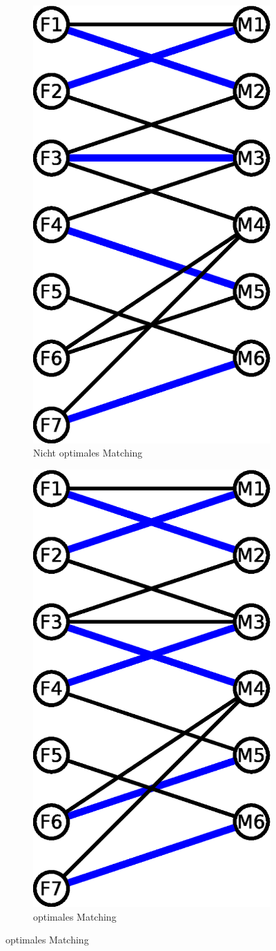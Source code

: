 \begin{figure}[H]
	\centering
	\begin{subfigure}[H]{0.4\linewidth}
		\centering
		\includegraphics[width=0.5\linewidth]{23/Grafik/Diagramm2}
		\caption{Nicht optimales Matching}
		\label{fig:Diagramm2}
	\end{subfigure}
	\begin{subfigure}[H]{0.4\linewidth}
		\centering
	\includegraphics[width=0.5\linewidth]{23/Grafik/Diagramm3}
	\caption{optimales Matching}
	\label{fig:Diagramm3}
	\end{subfigure}
\end{figure}%
\pagebreak

